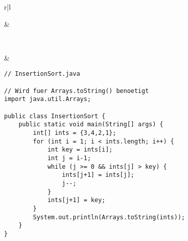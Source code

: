 \begin{center}
\begin{tabular}{r|l}
\begin{tikzpicture}
                 column 1/.style={nodes={fill=magenta!25}}]{
        2 & 3 & 4\\
    };
\end{tikzpicture} &
 \\
 & \\
\end{tabular}
\end{center}

\begin{center}
\begin{lstlisting}
// InsertionSort.java

// Wird fuer Arrays.toString() benoetigt
import java.util.Arrays;

public class InsertionSort {
    public static void main(String[] args) {
        int[] ints = {3,4,2,1};
        for (int i = 1; i < ints.length; i++) {
            int key = ints[i];
            int j = i-1;
            while (j >= 0 && ints[j] > key) {
                ints[j+1] = ints[j];
                j--;
            }
            ints[j+1] = key;
        }
        System.out.println(Arrays.toString(ints));
    }
}
\end{lstlisting}
\end{center}

